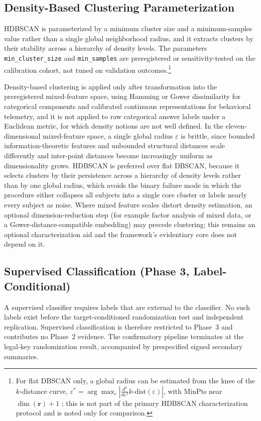 \documentclass[11pt,letterpaper]{article}
\begin{document}
\subsection{Density-Based Clustering Parameterization}
\label{sec:dbscan}

HDBSCAN \cite{campello2013} is parameterized by a minimum cluster size and a minimum-samples value rather than a single global neighborhood radius, and it extracts clusters by their stability across a hierarchy of density levels. The parameters \texttt{min\_cluster\_size} and \texttt{min\_samples} are preregistered or sensitivity-tested on the calibration cohort, not tuned on validation outcomes.\footnote{For flat DBSCAN only, a global radius can be estimated from the knee of the $k$-distance curve, $\varepsilon^* = \arg\max_\varepsilon \left| \frac{d^2}{d\varepsilon^2} k\text{-dist}(\varepsilon) \right|$, with MinPts near $\dim(\mathbf{r}) + 1$ \cite{ester1996}; this is not part of the primary HDBSCAN characterization protocol and is noted only for comparison.}

Density-based clustering is applied only after transformation into the preregistered mixed-feature space, using Hamming or Gower dissimilarity for categorical components and calibrated continuous representations for behavioral telemetry, and it is not applied to raw categorical answer labels under a Euclidean metric, for which density notions are not well defined. In the eleven-dimensional mixed-feature space, a single global radius $\varepsilon$ is brittle, since bounded information-theoretic features and unbounded structural distances scale differently and inter-point distances become increasingly uniform as dimensionality grows. HDBSCAN is preferred over flat DBSCAN, because it selects clusters by their persistence across a hierarchy of density levels rather than by one global radius, which avoids the binary failure mode in which the procedure either collapses all subjects into a single core cluster or labels nearly every subject as noise. Where mixed feature scales distort density estimation, an optional dimension-reduction step (for example factor analysis of mixed data, or a Gower-distance-compatible embedding) may precede clustering; this remains an optional characterization aid and the framework's evidentiary core does not depend on it.

\subsection{Supervised Classification (Phase 3, Label-Conditional)}
\label{sec:supervised}
A supervised classifier requires labels that are external to the classifier. No such labels exist before the target-conditioned randomization test and independent replication. Supervised classification is therefore restricted to Phase~3 and contributes no Phase~2 evidence. The confirmatory pipeline terminates at the legal-key randomization result, accompanied by prespecified signed secondary summaries.
\end{document}

